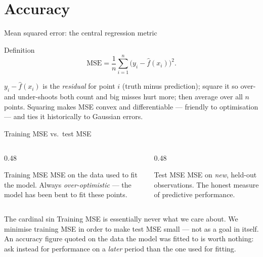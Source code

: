 \documentclass[aspectratio=169,11pt]{beamer}
\begin{document}
\section{Accuracy}

\begin{frame}{Mean squared error: the central regression metric}
  \par
  \begin{block}{Definition}
    \[
      \boxed{\;
        \mathrm{MSE} = \frac{1}{n}\sum_{i=1}^n
          \bigl(y_i - \hat f(x_i)\bigr)^2.
      \;}
    \]
  \end{block}
  \begin{readme}
    $y_i-\hat f(x_i)$ is the \emph{residual} for point $i$ (truth minus
    prediction); square it so over- and under-shoots both count and big
    misses hurt more; then average over all $n$ points. Squaring makes
    MSE convex and differentiable --- friendly to optimisation --- and
    ties it historically to Gaussian errors.
  \end{readme}
\end{frame}

\begin{frame}{Training MSE vs.\ test MSE}
  \begin{columns}[T]
    \begin{column}{0.48\textwidth}
      \begin{block}{Training MSE}
        MSE on the data used to fit the model. Always
        \emph{over-optimistic} --- the model has been bent to fit
        these points.
      \end{block}
    \end{column}
    \begin{column}{0.48\textwidth}
      \begin{block}{Test MSE}
        MSE on \emph{new}, held-out observations. The honest measure
        of predictive performance.
      \end{block}
    \end{column}
  \end{columns}
  \begin{alertblock}{The cardinal sin}
    Training MSE is essentially never what we care about. We minimise
    training MSE in order to make test MSE small --- not as a goal in
    itself. An accuracy figure quoted on the data the model was fitted
    to is worth nothing: ask instead for performance on a \emph{later}
    period than the one used for fitting.
  \end{alertblock}
\end{frame}
\end{document}
